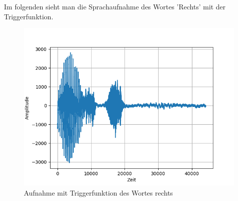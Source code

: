 \documentclass[12pt, oneside, a4paper, \docLanguage]{report}
\begin{document}
\newline
Im folgenden sieht man die Sprachaufnahme des Wortes 'Rechts' mit der Triggerfunktion.
\begin{figure}[H]
	\centering
	\includegraphics[width=.6\linewidth]{../data/img/rechtsamp.png}
	\caption{Aufnahme mit Triggerfunktion des Wortes rechts}
	\label{img:Aufnahme mit Triggerfunktion des Wortes rechts}
\end{figure}
\end{document}
